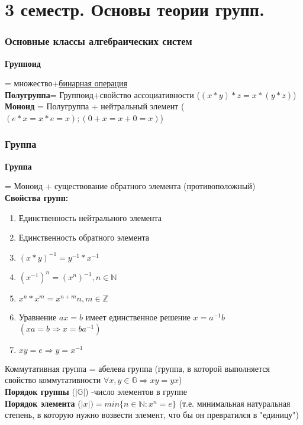 \documentclass[12pt]{article}
\begin{document}
	\tableofcontents
	\newpage
	\part{3 семестр. Основы теории групп.}
		\section{Основные классы алгебраических систем}
		\hypertarget{indef:gruppoid}{\textbf{Группоид}}= множество+\hyperref[def:bin_oper]{бинарная операция} \\
		\hypertarget{indef:halfgroup}{\textbf{Полугруппа}}= Группоид+свойство ассоциативности ($(x*y)*z=x*(y*z)$) \\
		\hypertarget{indef:monoid}{\textbf{Моноид}} = Полугруппа + нейтральный элемент ($(e*x=x*e=x) ; (0+x=x+0=x)$) \\
		\section{Группа}
		\hypertarget{indef:group}{\textbf{Группа}} = Моноид + существование обратного элемента (противоположный) \\
		\hypertarget{inpro:group}{\textbf{Свойства групп:}}\begin{enumerate}
			\item Единственность нейтрального элемента
			\item Единственность обратного элемента
			\item $(x*y)^{-1}=y^{-1}*x^{-1}$
			\item $(x^{-1})^n=(x^n)^{-1} , n \in \mathds{N}$
			\item $x^n*x^m=x^{n+m} n,m \in \mathds{Z} $ 
			\item Уравнение $ax=b$ имеет единственное решение $x=a^{-1}b$ 
			$(xa=b\Rightarrow x=ba^{-1})$
			\item $xy=e \Rightarrow y=x^{-1} $\\
		\end{enumerate}
		Коммутативная группа = абелева группа (группа, в которой выполняется свойство коммутативности $\forall x, y \in \mathds{G} \Rightarrow xy=yx$)\\
		\hypertarget{indef:por_group}{\textbf{Порядок группы}} ($|\mathds{G}|$) -число элементов в группе\\
		\hypertarget{indef:por_el}{\textbf{Порядок элемента}} ($|x|)= min \{ n\in\mathds{N} :x^n=e\}$ (т.е. минимальная натуральная степень, в которую нужно возвести элемент, что бы он превратился в "единицу") \\
		
\end{document}
